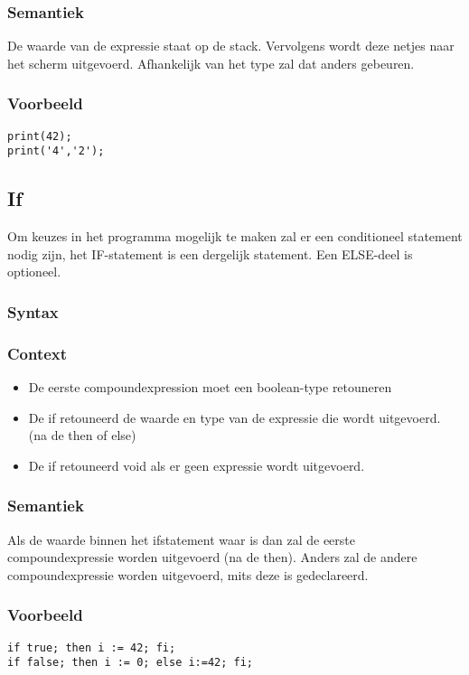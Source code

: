 \documentclass[]{article}
\begin{document}
\subsubsection{Semantiek}
De waarde van de expressie staat op de stack. Vervolgens wordt deze netjes naar het scherm uitgevoerd. Afhankelijk van het type zal dat anders gebeuren. 
\subsubsection{Voorbeeld}
\begin{lstlisting}[style=SELMA]
print(42);
print('4','2');
\end{lstlisting}

\subsection{If}
Om keuzes in het programma mogelijk te maken zal er een conditioneel statement nodig zijn, het IF-statement is een dergelijk statement. Een ELSE-deel is optioneel.
\subsubsection{Syntax}

\subsubsection{Context}
\begin{itemize}
\item De eerste compoundexpression moet een boolean-type retouneren
\item De if retouneerd de waarde en type van de expressie die wordt uitgevoerd. (na de then of else)
\item De if retouneerd void als er geen expressie wordt uitgevoerd.
\end{itemize}
\subsubsection{Semantiek}
Als de waarde binnen het ifstatement waar is dan zal de eerste compoundexpressie worden uitgevoerd (na de then). Anders zal de andere compoundexpressie worden uitgevoerd, mits deze is gedeclareerd.
\subsubsection{Voorbeeld}
\begin{lstlisting}[style=SELMA]
if true; then i := 42; fi;
if false; then i := 0; else i:=42; fi;
\end{lstlisting}
\end{document}
